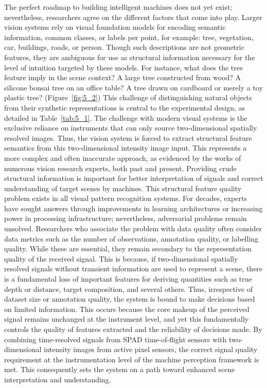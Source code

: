 \documentclass[12pt,a4paper,oneside]{report}
\begin{document}
The perfect roadmap to building intelligent machines does not yet exist; nevertheless, researchers agree on the different factors that come into play. Larger vision systems rely on visual foundation models for encoding semantic information, common classes, or labels per point, for example: tree, vegetation, car, buildings, roads, or person. Though such descriptions are not geometric features, they are ambiguous for use as structural information necessary for the level of intuition targeted by these models. For instance, what does the tree feature imply in the scene context? A large tree constructed from wood? A silicone bonsai tree on an office table? A tree drawn on cardboard or merely a toy plastic tree? (Figure~\ref{fig:5_2}) This challenge of distinguishing natural objects from their synthetic representations is central to the experimental design, as detailed in Table~\ref{tab:5_1}. The challenge with modern visual systems is the exclusive reliance on instruments that can only source two-dimensional spatially resolved images. Thus, the vision system is forced to extract structural feature semantics from this two-dimensional intensity image input. This represents a more complex and often inaccurate approach, as evidenced by the works of numerous vision research experts, both past and present. Providing crude structural information is important for better interpretation of signals and correct understanding of target scenes by machines. This structural feature quality problem exists in all visual pattern recognition systems. For decades, experts have sought answers through improvements in learning architectures or increasing power in processing infrastructure; nevertheless, adversarial problems remain unsolved. Researchers who associate the problem with data quality often consider data metrics such as the number of observations, annotation quality, or labelling quality. While these are essential, they remain secondary to the representation quality of the received signal. This is because, if two-dimensional spatially resolved signals without transient information are used to represent a scene, there is a fundamental loss of important features for deriving quantities such as true depth or distance, target composition, and several others. Thus, irrespective of dataset size or annotation quality, the system is bound to make decisions based on limited information. This occurs because the core makeup of the perceived signal remains unchanged at the instrument level, and yet this fundamentally controls the quality of features extracted and the reliability of decisions made. By combining time-resolved signals from SPAD time-of-flight sensors with two-dimensional intensity images from active pixel sensors, the correct signal quality requirement at the instrumentation level of the machine perception framework is met. This consequently sets the system on a path toward enhanced scene interpretation and understanding.
\end{document}
